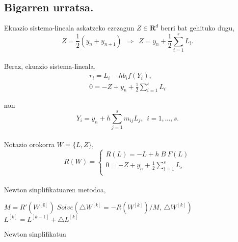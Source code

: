 \subsection*{Bigarren urratsa.}

Ekuazio sistema-lineala askatzeko ezezagun $Z \in \mathbf{R}^d$ berri bat gehituko dugu,
\begin{equation*}
Z=\frac{1}{2} (y_n+y_{n+1}) \ \ \Rightarrow \ \ Z=y_n+\frac{1}{2} \sum\limits_{i=1}^{s} L_i.
\end{equation*}


\paragraph*{}Beraz, ekuazio sistema-lineala,
\begin{align*}
r_i=L_i-hb_i f(Y_i), \\
0=-Z+y_n+\frac{1}{2} \sum\limits_{i=1}^{s} L_i
\end{align*}

non
\begin{equation*}
Y_i=y_n+h \sum\limits_{j=1}^{s} m_{ij}L_j, \ \ i=1,\dots,s.
\end{equation*}

\paragraph*{} Notazio orokorra $W=\{L,Z\}$,
\begin{equation*}
R(W) =
\begin{cases}
R(L)=-L+ h \ B \ F(L)\\
0=-Z+y_n+\frac{1}{2} \sum\limits_{i=1}^{s} L_i\\
\end{cases}
\end{equation*}

\paragraph*{} Newton sinplifikatuaren metodoa,
\begin{algorithm}[h]
  $M=R'(W^{[0]})$\;
  {
   \BlankLine
   $Solve(\triangle W^{[k]}=- R(W^{[k]})/M, \ \triangle W^{[k]})$\;
   \BlankLine
   $L^{[k]}=L^{[k-1]}+\triangle L^{[k]}$\;
  }
 \caption{Newton sinplifikatua}
\end{algorithm}

